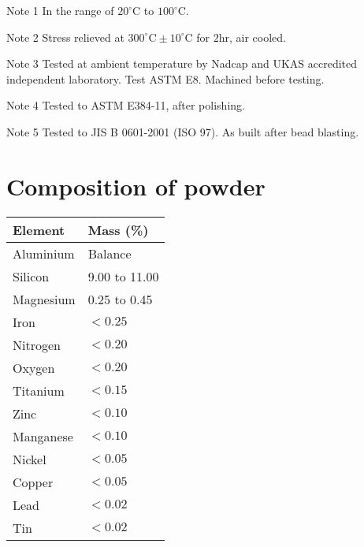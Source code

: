 \documentclass[10pt]{article}
\begin{document}
Note 1 In the range of $20^{\circ} \mathrm{C}$ to $100^{\circ} \mathrm{C}$.

Note 2 Stress relieved at $300^{\circ} \mathrm{C} \pm 10^{\circ} \mathrm{C}$ for $2 \mathrm{hr}$, air cooled.

Note 3 Tested at ambient temperature by Nadcap and UKAS accredited independent laboratory. Test ASTM E8. Machined before testing.

Note 4 Tested to ASTM E384-11, after polishing.

Note 5 Tested to JIS B 0601-2001 (ISO 97). As built after bead blasting.

\section*{Composition of powder}
\begin{center}
\begin{tabular}{|l|l|}
\hline
Element & Mass (\%) \\
\hline
Aluminium & Balance \\
\hline
Silicon & 9.00 to 11.00 \\
\hline
Magnesium & 0.25 to 0.45 \\
\hline
Iron & $<0.25$ \\
\hline
Nitrogen & $<0.20$ \\
\hline
Oxygen & $<0.20$ \\
\hline
Titanium & $<0.15$ \\
\hline
Zinc & $<0.10$ \\
\hline
Manganese & $<0.10$ \\
\hline
Nickel & $<0.05$ \\
\hline
Copper & $<0.05$ \\
\hline
Lead & $<0.02$ \\
\hline
Tin & $<0.02$ \\
\hline
\end{tabular}
\end{center}
\end{document}
